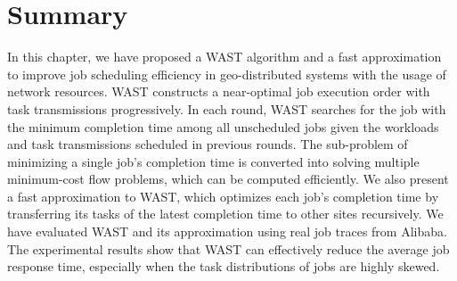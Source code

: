 \section{Summary}
\label{sec:conclusion2}
In this chapter, we have proposed a WAST algorithm and a fast approximation to improve job scheduling efficiency in geo-distributed systems with the usage of network resources. WAST constructs a near-optimal job execution order with task transmissions progressively. In each round, WAST searches for the job with the minimum completion time among all unscheduled jobs given the workloads and task transmissions scheduled in previous rounds. The sub-problem of minimizing a single job's completion time is converted into solving multiple minimum-cost flow problems, which can be computed efficiently. 
We also present a fast approximation to WAST, which optimizes each job's completion time by transferring its tasks of the latest completion time to other sites recursively. We have evaluated WAST and its approximation using real job traces from Alibaba. The experimental results show that WAST can effectively reduce the average job response time, especially when the task distributions of jobs are highly skewed.